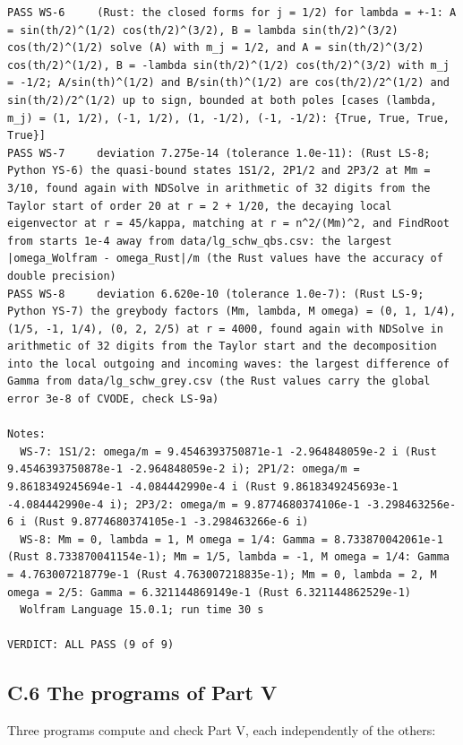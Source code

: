 \documentclass[
  10pt,
]{article}
\begin{document}
\begin{verbatim}
PASS WS-6     (Rust: the closed forms for j = 1/2) for lambda = +-1: A = sin(th/2)^(1/2) cos(th/2)^(3/2), B = lambda sin(th/2)^(3/2) cos(th/2)^(1/2) solve (A) with m_j = 1/2, and A = sin(th/2)^(3/2) cos(th/2)^(1/2), B = -lambda sin(th/2)^(1/2) cos(th/2)^(3/2) with m_j = -1/2; A/sin(th)^(1/2) and B/sin(th)^(1/2) are cos(th/2)/2^(1/2) and sin(th/2)/2^(1/2) up to sign, bounded at both poles [cases (lambda, m_j) = (1, 1/2), (-1, 1/2), (1, -1/2), (-1, -1/2): {True, True, True, True}]
PASS WS-7     deviation 7.275e-14 (tolerance 1.0e-11): (Rust LS-8; Python YS-6) the quasi-bound states 1S1/2, 2P1/2 and 2P3/2 at Mm = 3/10, found again with NDSolve in arithmetic of 32 digits from the Taylor start of order 20 at r = 2 + 1/20, the decaying local eigenvector at r = 45/kappa, matching at r = n^2/(Mm)^2, and FindRoot from starts 1e-4 away from data/lg_schw_qbs.csv: the largest |omega_Wolfram - omega_Rust|/m (the Rust values have the accuracy of double precision)
PASS WS-8     deviation 6.620e-10 (tolerance 1.0e-7): (Rust LS-9; Python YS-7) the greybody factors (Mm, lambda, M omega) = (0, 1, 1/4), (1/5, -1, 1/4), (0, 2, 2/5) at r = 4000, found again with NDSolve in arithmetic of 32 digits from the Taylor start and the decomposition into the local outgoing and incoming waves: the largest difference of Gamma from data/lg_schw_grey.csv (the Rust values carry the global error 3e-8 of CVODE, check LS-9a)

Notes:
  WS-7: 1S1/2: omega/m = 9.4546393750871e-1 -2.964848059e-2 i (Rust 9.4546393750878e-1 -2.964848059e-2 i); 2P1/2: omega/m = 9.8618349245694e-1 -4.084442990e-4 i (Rust 9.8618349245693e-1 -4.084442990e-4 i); 2P3/2: omega/m = 9.8774680374106e-1 -3.298463256e-6 i (Rust 9.8774680374105e-1 -3.298463266e-6 i)
  WS-8: Mm = 0, lambda = 1, M omega = 1/4: Gamma = 8.733870042061e-1 (Rust 8.733870041154e-1); Mm = 1/5, lambda = -1, M omega = 1/4: Gamma = 4.763007218779e-1 (Rust 4.763007218835e-1); Mm = 0, lambda = 2, M omega = 2/5: Gamma = 6.321144869149e-1 (Rust 6.321144862529e-1)
  Wolfram Language 15.0.1; run time 30 s

VERDICT: ALL PASS (9 of 9)
\end{verbatim}

\hypertarget{c.6-the-programs-of-part-v}{%
\subsection{C.6 The programs of Part
V}\label{c.6-the-programs-of-part-v}}

Three programs compute and check Part V, each independently of the
others:
\end{document}
